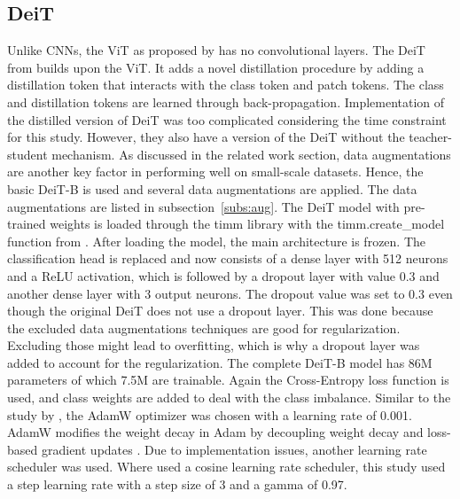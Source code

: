 \documentclass[11pt, a4paper]{article}
\begin{document}
\subsection{DeiT} \label{subs:deitmethod}
Unlike CNNs, the ViT as proposed by \cite{Dosovitskiy2020AnScale} has no convolutional layers. 
The DeiT from \cite{Touvron2021TrainingAttention} builds upon the ViT. It adds a novel distillation procedure by adding a distillation token that interacts with the class token and patch tokens. The class and distillation tokens are learned through back-propagation. Implementation of the distilled version of DeiT was too complicated considering the time constraint for this study. However, they also have a version of the DeiT without the teacher-student mechanism. As discussed in the related work section, data augmentations are another key factor in performing well on small-scale datasets. Hence, the basic DeiT-B is used and several data augmentations are applied. The data augmentations are listed in subsection~\ref{subs:aug}. The DeiT model with pre-trained weights is loaded through the timm library with the timm.create\_model function from \citeauthor{Wightman2022PyTorchModels}. After loading the model, the main architecture is frozen. The classification head is replaced and now consists of a dense layer with 512 neurons and a ReLU activation, which is followed by a dropout layer with value 0.3 and another dense layer with 3 output neurons. The dropout value was set to 0.3 even though the original DeiT does not use a dropout layer. This was done because the excluded data augmentations techniques are good for regularization. Excluding those might lead to overfitting, which is why a dropout layer was added to account for the regularization. The complete DeiT-B model has 86M parameters of which 7.5M are trainable. Again the Cross-Entropy loss function is used, and class weights are added to deal with the class imbalance. Similar to the study by \cite{Touvron2021TrainingAttention}, the AdamW optimizer was chosen with a learning rate of 0.001. AdamW modifies the weight decay in Adam by decoupling weight decay and loss-based gradient updates \citep{Loshchilov2019DecoupledRegularization}. Due to implementation issues, another learning rate scheduler was used. Where \cite{Touvron2021TrainingAttention} used a cosine learning rate scheduler, this study used a step learning rate with a step size of 3 and a gamma of 0.97. 
\end{document}

